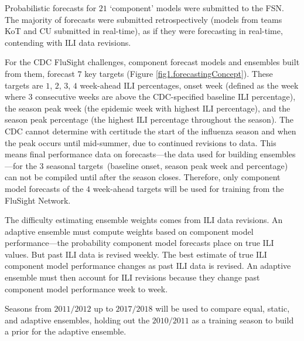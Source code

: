 \documentclass[12pt]{article}
\def\ngr#1{{\small\color{Red}\textbf{[ngr: #1]}}}
\begin{document}
Probabilistic forecasts for $21$ `component' models were submitted to the FSN.
The majority of forecasts were submitted retrospectively (models from teams KoT and CU submitted in real-time), as if they were forecasting in real-time, contending with ILI data revisions.

For the CDC FluSight challenges, component forecast models and ensembles built from them, forecast $7$ key targets (Figure \ref{fig1.forecastingConcept}). These targets are $1$, $2$, $3$, $4$ week-ahead ILI percentages, onset week (defined as the week where $3$ consecutive weeks are above the CDC-specified baseline ILI percentage), the season peak week (the epidemic week with highest ILI percentage), and the season peak percentage (the highest ILI percentage throughout the season).
The CDC cannot determine with certitude the start of the influenza season and when the peak occurs until mid-summer, due to continued revisions to data.
This means final performance data on forecasts---the data used for building ensembles---for the $3$ seasonal targets~(baseline onset, season peak week and percentage) can not be compiled until after the season closes.
Therefore, only component model forecasts of the $4$ week-ahead targets will be used for training from the FluSight Network.

The difficulty estimating ensemble weights comes from ILI data revisions.
An adaptive ensemble must compute weights based on component model performance---the probability component model forecasts place on true ILI values.
But past ILI data is revised weekly.
The best estimate of true ILI component model performance changes as past ILI data is revised. 
An adaptive ensemble must then account for ILI revisions because they change past component model performance week to week.

Seasons from $2011/2012$ up to $2017/2018$ will be used to compare equal, static, and adaptive ensembles, holding out the $2010/2011$ as a training season to build a prior for the adaptive ensemble.
\end{document}
